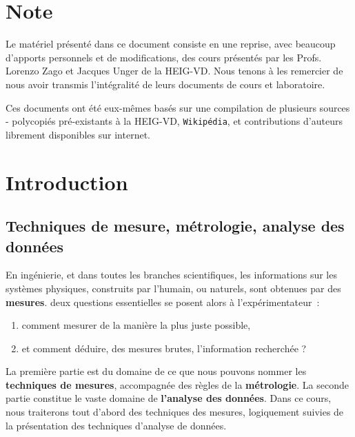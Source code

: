 \chapter*{Note}

Le matériel présenté dans ce document consiste en une reprise, avec beaucoup d'apports personnels et de modifications, des cours présentés par les Profs. Lorenzo Zago et Jacques Unger de la HEIG-VD. Nous tenons à les remercier de nous avoir transmis l'intégralité de leurs documents de cours et laboratoire.

Ces documents ont été eux-mêmes basés sur une compilation de plusieurs sources - polycopiés pré-existants à la HEIG-VD, \texttt{Wikipédia}, et contributions d'auteurs librement disponibles sur internet.

\chapter{Introduction}

\section{Techniques de mesure, métrologie, analyse des données}

En ingénierie, et dans toutes les branches scientifiques, les informations sur les systèmes physiques, construits par l'humain, ou naturels, sont obtenues par des \textbf{mesures}. deux questions essentielles se posent alors à l'expérimentateur~:
\begin{enumerate}
\item comment mesurer de la manière la plus juste possible,
\item et comment déduire, des mesures brutes, l'information recherchée ?
\end{enumerate}
La première partie est du domaine de ce que nous pouvons nommer les \textbf{techniques de mesures}, accompagnée des règles de la \textbf{métrologie}. La seconde partie constitue le vaste domaine de \textbf{l'analyse des données}. Dans ce cours, nous traiterons tout d'abord des techniques des mesures, logiquement suivies de la présentation des techniques d'analyse de données.

